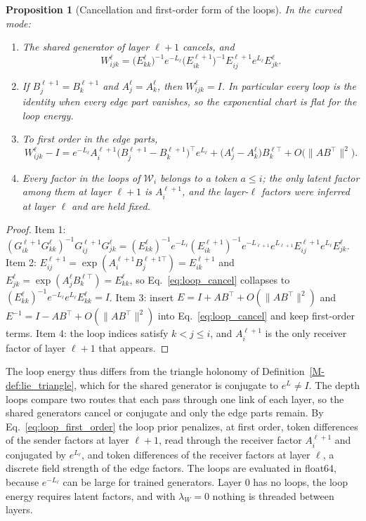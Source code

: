 \documentclass[11pt]{article}
\newtheorem{proposition}[theorem]{Proposition}
\theoremstyle{definition}
\theoremstyle{remark}
\newcommand{\Mref}[1]{\ref{M-#1}}
\begin{document}
\begin{proposition}[Cancellation and first-order form of the loops]
\label{prop:loops}
In the curved mode:
\begin{enumerate}
\item The shared generator of layer $\ell+1$ cancels, and
\begin{equation}
W_{ijk}^\ell=\bigl(E_{kk}^\ell\bigr)^{-1}e^{-L_\ell}\bigl(E_{ik}^{\ell+1}\bigr)^{-1}E_{ij}^{\ell+1}e^{L_\ell}E_{jk}^\ell.
\label{eq:loop_cancel}
\end{equation}
\item If $B_j^{\ell+1}=B_k^{\ell+1}$ and $A_j^\ell=A_k^\ell$, then $W_{ijk}^\ell=I$. In particular every loop is the identity when every edge part vanishes, so the exponential chart is flat for the loop energy.
\item To first order in the edge parts,
\begin{equation}
W_{ijk}^\ell-I=e^{-L_\ell}A_i^{\ell+1}\bigl(B_j^{\ell+1}-B_k^{\ell+1}\bigr)^\top e^{L_\ell}+\bigl(A_j^\ell-A_k^\ell\bigr)B_k^{\ell\top}+O\bigl(\|AB^\top\|^2\bigr).
\label{eq:loop_first_order}
\end{equation}
\item Every factor in the loops of $\mathcal W_i$ belongs to a token $a\le i$; the only latent factor among them at layer $\ell+1$ is $A_i^{\ell+1}$, and the layer-$\ell$ factors were inferred at layer $\ell$ and are held fixed.
\end{enumerate}
\end{proposition}
\begin{proof}
Item 1: $(G_{ik}^{\ell+1}G_{kk}^\ell)^{-1}G_{ij}^{\ell+1}G_{jk}^\ell=(E_{kk}^\ell)^{-1}e^{-L_\ell}(E_{ik}^{\ell+1})^{-1}e^{-L_{\ell+1}}e^{L_{\ell+1}}E_{ij}^{\ell+1}e^{L_\ell}E_{jk}^\ell$. Item 2: $E^{\ell+1}_{ij}=\exp(A_i^{\ell+1}B_j^{\ell+1\top})=E^{\ell+1}_{ik}$ and $E^\ell_{jk}=\exp(A_j^\ell B_k^{\ell\top})=E^\ell_{kk}$, so Eq.~\eqref{eq:loop_cancel} collapses to $(E_{kk}^\ell)^{-1}e^{-L_\ell}e^{L_\ell}E_{kk}^\ell=I$. Item 3: insert $E=I+AB^\top+O(\|AB^\top\|^2)$ and $E^{-1}=I-AB^\top+O(\|AB^\top\|^2)$ into Eq.~\eqref{eq:loop_cancel} and keep first-order terms. Item 4: the loop indices satisfy $k<j\le i$, and $A_i^{\ell+1}$ is the only receiver factor of layer $\ell+1$ that appears.
\end{proof}

The loop energy thus differs from the triangle holonomy of Definition~\Mref{def:lie_triangle}, which for the shared generator is conjugate to $e^{L}\ne I$. The depth loops compare two routes that each pass through one link of each layer, so the shared generators cancel or conjugate and only the edge parts remain. By Eq.~\eqref{eq:loop_first_order} the loop prior penalizes, at first order, token differences of the sender factors at layer $\ell+1$, read through the receiver factor $A_i^{\ell+1}$ and conjugated by $e^{L_\ell}$, and token differences of the receiver factors at layer $\ell$, a discrete field strength of the edge factors. The loops are evaluated in float64, because $e^{-L_\ell}$ can be large for trained generators. Layer 0 has no loops, the loop energy requires latent factors, and with $\lambda_W=0$ nothing is threaded between layers.
\end{document}
